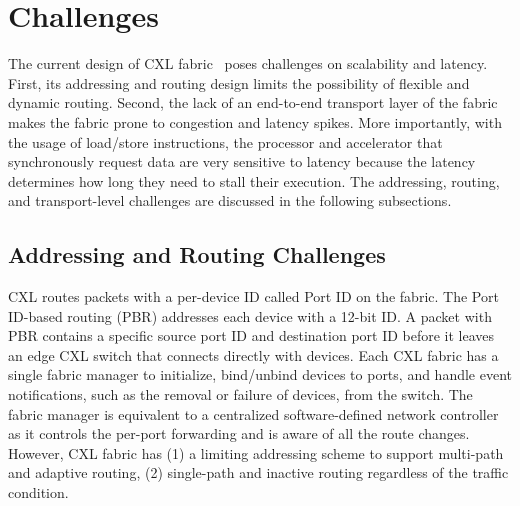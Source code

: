 \section{Challenges}
%
The current design of CXL fabric~\cite{cxl-3-0-spec} poses challenges on scalability and latency. 
%
First, its addressing and routing design limits the possibility of flexible and dynamic routing. 
%
Second, the lack of an end-to-end transport layer of the fabric makes the fabric prone to congestion and latency spikes. 
%
More importantly, with the usage of load/store instructions, the processor and accelerator that synchronously request data are very sensitive to latency because the latency determines how long they need to stall their execution.
%
The addressing, routing, and transport-level challenges are discussed in the following subsections.  

\subsection{Addressing and Routing Challenges}
\label{aurelia:sec:motivation:routing}

CXL routes packets with a per-device ID called Port ID on the fabric. 
%
The Port ID-based routing (PBR) addresses each device with a 12-bit ID. 
%
A packet with PBR contains a specific source port ID and destination port ID before it leaves an edge CXL switch that connects directly with devices.
%
Each CXL fabric has a single fabric manager to initialize, bind/unbind devices to ports, and handle event notifications, such as the removal or failure of devices, from the switch.   
%
The fabric manager is equivalent to a centralized software-defined network controller as it controls the per-port forwarding and is aware of all the route changes. 
%
However, CXL fabric has (1) a limiting addressing scheme to support multi-path and adaptive routing, %
(2) single-path and inactive routing regardless of the traffic condition.

